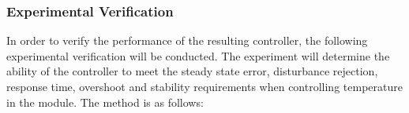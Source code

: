 

\subsubsection{Experimental Verification}

In order to verify the performance of the resulting controller, the following experimental verification will be conducted. The experiment will determine the ability of the controller to meet the steady state error, disturbance rejection, response time, overshoot and stability requirements when controlling temperature in the module. The method is as follows:

